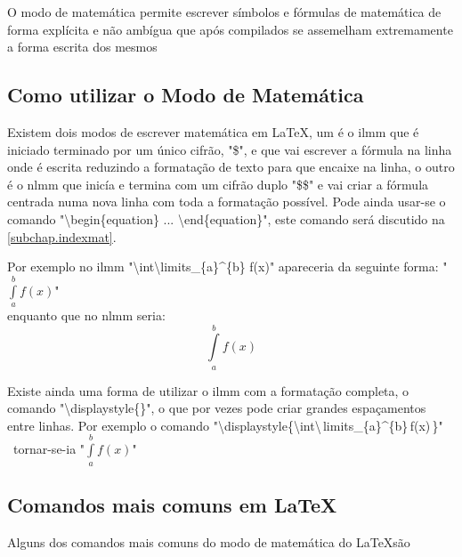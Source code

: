

O modo de matemática permite escrever símbolos e fórmulas de matemática de forma explícita e não ambígua que após compilados se assemelham extremamente a forma escrita dos mesmos

\subsection{Como utilizar o Modo de Matemática}
Existem dois modos de escrever matemática em \LaTeX , um é o \ac{ilmm} que é iniciado terminado por um único cifrão, "\$", e que vai escrever a fórmula na linha onde é escrita reduzindo a formatação de texto para que encaixe na linha, o outro é o \ac{nlmm} que inicía e termina com um cifrão duplo "\$\$" e vai criar a fórmula centrada numa nova linha com toda a formatação possível. Pode ainda usar-se o comando "\textbackslash begin\{equation\} ... \textbackslash end\{equation\}", este comando será discutido na \autoref{subchap.indexmat}.

Por exemplo no \ac{ilmm} "\textbackslash int\textbackslash limits\_\{a\}\textasciicircum\{b\} f(x)" apareceria da seguinte forma: "$\int \limits_{a}^{b} f(x)$"\\ enquanto que no \ac{nlmm} seria:
$$\int \limits_{a}^{b} f(x)$$

Existe ainda uma forma de utilizar o \ac{ilmm} com a formatação completa, o comando "\textbackslash displaystyle\{\}", o que por vezes pode criar grandes espaçamentos entre linhas.
Por exemplo o comando "\textbackslash displaystyle\{\textbackslash int\textbackslash\,limits\_\{a\}\textasciicircum\{b\}\,f(x)\,\}" \ \mbox{tornar-se-ia} "$\displaystyle{\int \limits_{a}^{b} f(x)}$"

\subsection{Comandos mais comuns em \LaTeX}
Alguns dos comandos mais comuns do modo de matemática do \LaTeX são

